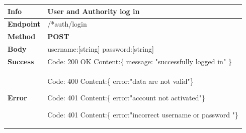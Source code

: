 \begin{table}[H]
\begin{tabular}{|l|p{}|}
\hline
\textbf{Info}             & User and Authority log in                                                                       \\ \hline
\textbf{Endpoint}    &  /*auth/login\\ \hline
\textbf{Method}         &   \textbf{POST}                                                                            \\ \hline

\textbf{Body}  &     username:[string] \newline
                   password:[string] 
              
                    \\ \hline
                    
\textbf{Success} &  Code: 200 OK \newline
                    Content:\{\newline 
                    message: "successfully logged in"\newline 
                    \}\\ \hline
\textbf{Error} &   Code: 400 \newline
                  Content:\{\newline
                  error:"data are not valid"\newline\}\newline
                  
                  Code: 401 \newline
                  Content:\{\newline
                  error:"account not activated"\newline\}\newline
                  
                  Code: 401 \newline
                  Content:\{\newline
                  error:"incorrect username or password "\newline\}\\\hline

\end{tabular}
\end{table}






